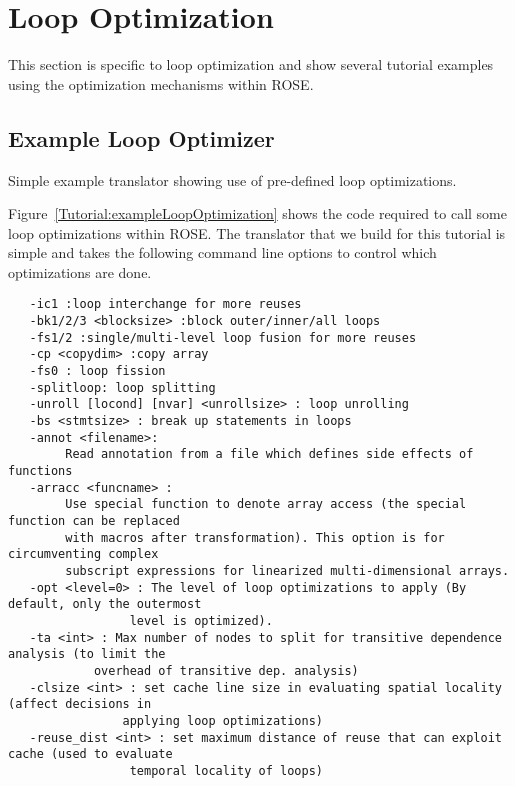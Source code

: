 \chapter{Loop Optimization}

    This section is specific to loop optimization and show several
tutorial examples using the optimization mechanisms within ROSE. 

\section{Example Loop Optimizer}
     Simple example translator showing use of pre-defined loop optimizations.

   Figure~\ref{Tutorial:exampleLoopOptimization} shows the code required to
call some loop optimizations within ROSE.  The translator that we build for this tutorial
is simple and takes the following command line options to control which optimizations are done.


\begin{verbatim}
   -ic1 :loop interchange for more reuses
   -bk1/2/3 <blocksize> :block outer/inner/all loops
   -fs1/2 :single/multi-level loop fusion for more reuses 
   -cp <copydim> :copy array 
   -fs0 : loop fission
   -splitloop: loop splitting 
   -unroll [locond] [nvar] <unrollsize> : loop unrolling 
   -bs <stmtsize> : break up statements in loops
   -annot <filename>: 
        Read annotation from a file which defines side effects of functions
   -arracc <funcname> :
        Use special function to denote array access (the special function can be replaced
        with macros after transformation). This option is for circumventing complex 
        subscript expressions for linearized multi-dimensional arrays.
   -opt <level=0> : The level of loop optimizations to apply (By default, only the outermost
                 level is optimized).
   -ta <int> : Max number of nodes to split for transitive dependence analysis (to limit the 
            overhead of transitive dep. analysis)
   -clsize <int> : set cache line size in evaluating spatial locality (affect decisions in 
                applying loop optimizations)
   -reuse_dist <int> : set maximum distance of reuse that can exploit cache (used to evaluate 
                 temporal locality of loops)
\end{verbatim}

